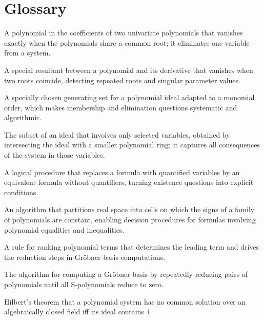 \theoryapplications
{}
\section*{Glossary}
\begin{description}[leftmargin=*,style=nextline,itemsep=0.3em]
\item[\textbf{Resultant.}] A polynomial in the coefficients of two univariate polynomials that vanishes exactly when the polynomials share a common root; it eliminates one variable from a system.
\item[\textbf{Discriminant.}] A special resultant between a polynomial and its derivative that vanishes when two roots coincide, detecting repeated roots and singular parameter values.
\item[\textbf{Gröbner basis.}] A specially chosen generating set for a polynomial ideal adapted to a monomial order, which makes membership and elimination questions systematic and algorithmic.
\item[\textbf{Elimination ideal.}] The subset of an ideal that involves only selected variables, obtained by intersecting the ideal with a smaller polynomial ring; it captures all consequences of the system in those variables.
\item[\textbf{Quantifier elimination.}] A logical procedure that replaces a formula with quantified variables by an equivalent formula without quantifiers, turning existence questions into explicit conditions.
\item[\textbf{Cylindrical algebraic decomposition.}] An algorithm that partitions real space into cells on which the signs of a family of polynomials are constant, enabling decision procedures for formulas involving polynomial equalities and inequalities.
\item[\textbf{Monomial order.}] A rule for ranking polynomial terms that determines the leading term and drives the reduction steps in Gröbner-basis computations.
\item[\textbf{Buchberger's algorithm.}] The algorithm for computing a Gröbner basis by repeatedly reducing pairs of polynomials until all S-polynomials reduce to zero.
\item[\textbf{Nullstellensatz.}] Hilbert's theorem that a polynomial system has no common solution over an algebraically closed field iff its ideal contains $1$.
\end{description}

